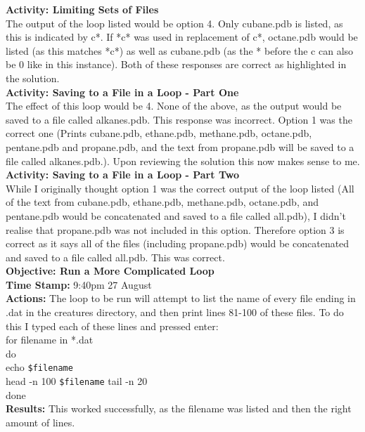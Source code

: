 \documentclass{article}
\begin{document}
\begin{FlushLeft}
\vspace{5mm}
\textbf{Activity: Limiting Sets of Files}\\
The output of the loop listed would be option 4. Only cubane.pdb is listed, as this is indicated by c*. If *c* was used in replacement of c*, octane.pdb would be listed (as this matches *c*) as well as cubane.pdb (as the * before the c can also be 0 like in this instance). Both of these responses are correct as highlighted in the solution.\\
\vspace{5mm}
\textbf{Activity: Saving to a File in a Loop - Part One}\\
The effect of this loop would be 4. None of the above, as the output would be saved to a file called alkanes.pdb. This response was incorrect. Option 1 was the correct one (Prints cubane.pdb, ethane.pdb, methane.pdb, octane.pdb, pentane.pdb and propane.pdb, and the text from propane.pdb will be saved to a file called alkanes.pdb.). Upon reviewing the solution this now makes sense to me.\\
\vspace{5mm}
\textbf{Activity: Saving to a File in a Loop - Part Two}\\
While I originally thought option 1 was the correct output of the loop listed (All of the text from cubane.pdb, ethane.pdb, methane.pdb, octane.pdb, and pentane.pdb would be concatenated and saved to a file called all.pdb), I didn't realise that propane.pdb was not included in this option. Therefore option 3 is correct as it says all of the files (including propane.pdb) would be concatenated and saved to a file called all.pdb. This was correct.\\
\vspace{5mm}
\textbf{Objective: Run a More Complicated Loop}\\ 
\textbf{Time Stamp:} 9:40pm 27 August\\
\textbf{Actions:} The loop to be run will attempt to list the name of every file ending in .dat in the creatures directory, and then print lines 81-100 of these files. To do this I typed each of these lines and pressed enter:\\
for filename in *.dat\\
do \\
echo \verb|$filename|\\
head -n 100 \verb|$filename| \textbar{} tail -n 20\\
done\\
\textbf{Results:} This worked successfully, as the filename was listed and then the right amount of lines. \\

\end{FlushLeft}
\end{document}
